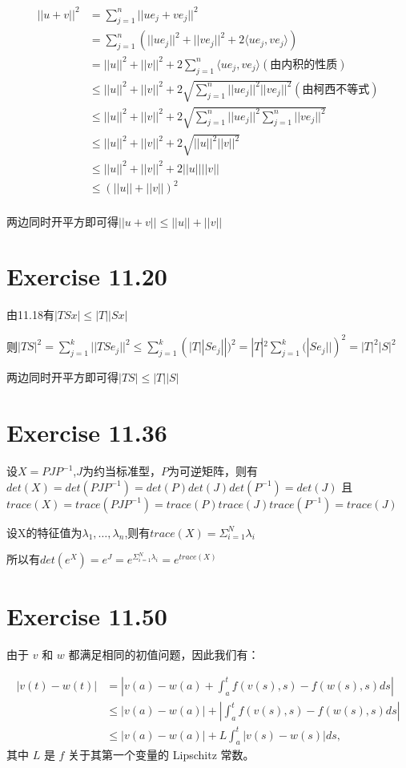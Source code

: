 \documentclass[twoside,a4paper]{article}
\begin{document}
\begin{align}
  ||u+v||^2&= \sum_{j=1}^n||ue_j+ve_j||^2\\
  &= \sum_{j=1}^n(||ue_j||^2+||ve_j||^2+2\langle ue_j,ve_j\rangle)\\
  &=||u||^2+||v||^2+2\sum_{j=1}^n\langle ue_j,ve_j\rangle(\mbox{由内积的性质})\\
  &\le ||u||^2+||v||^2+2\sqrt{\sum_{j=1}^n||ue_j||^2||ve_j||^2}(\mbox{由柯西不等式})\\
  &\le ||u||^2+||v||^2+2\sqrt{\sum_{j=1}^n||ue_j||^2\sum_{j=1}^n||ve_j||^2}\\
  &\le ||u||^2+||v||^2+2\sqrt{||u||^2||v||^2}\\
  &\le ||u||^2+||v||^2+2||u||||v||\\
  &\le (||u||+||v||)^2\\
\end{align}

两边同时开平方即可得$||u+v||\le ||u||+||v||$


\section{Exercise 11.20}

由11.18有$|TSx|\le|T||Sx|$

则$|TS|^2=\sum_{j=1}^k||TSe_j||^2\le\sum_{j=1}^k(|T||Se_j||)^2=|T|^2\sum_{j=1}^k(|Se_j||)^2=|T|^2|S|^2$

两边同时开平方即可得$|TS|\le|T||S|$

\section{Exercise 11.36}

设$X=PJP^{-1}$,$J$为约当标准型，$P$为可逆矩阵，则有$det(X)=det(PJP^{-1})=det(P)det(J)det(P^{-1})=det(J)$
且$trace(X)=trace(PJP^{-1})=trace(P)trace(J)trace(P^{-1})=trace(J)$

设X的特征值为$\lambda_1,\dots,\lambda_n$,则有$trace(X)=\Sigma_{i=1}^N\lambda_i$

所以有$det(e^{X})=e^{J}=e^{\Sigma_{i=1}^N\lambda_i}=e^{trace(X)}$

\section{Exercise 11.50}
由于 $v$ 和 $w$ 都满足相同的初值问题，因此我们有：

$$\begin{aligned}
|v(t) - w(t)| &= |v(a) - w(a) + \int_a^t f(v(s),s) - f(w(s),s)ds| \\
&\leq |v(a) - w(a)| + \left|\int_a^t f(v(s),s) - f(w(s),s)ds\right| \\
&\leq |v(a) - w(a)| + L\int_a^t |v(s) - w(s)|ds,
\end{aligned}$$
其中 $L$ 是 $f$ 关于其第一个变量的 Lipschitz 常数。 
\end{document}
